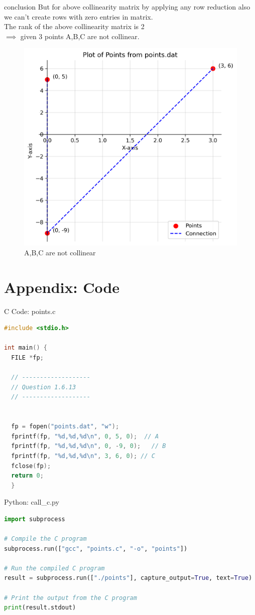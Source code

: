 \documentclass{beamer}
\numberwithin{equation}{section}
\theoremstyle{remark}
\begin{document}
\begin{frame}{conclusion}
    But  for above collinearity matrix by applying any row reduction also we can't create  rows with zero entries in matrix.\\
 The rank of the above collinearity matrix is 2\\
 $\implies$ given 3 points A,B,C are not collinear.
 \begin{figure}[h!]
   \centering
   \includegraphics[width=0.5\linewidth]{figs/01.png}
   \caption{A,B,C are not collinear}
   \label{}
\end{figure}
\end{frame}
\section*{Appendix: Code}

\begin{frame}[fragile]{C Code: points.c}
\begin{lstlisting}[language=C]
#include <stdio.h>

int main() {
  FILE *fp;

  // -------------------
  // Question 1.6.13
  // -------------------


  fp = fopen("points.dat", "w");
  fprintf(fp, "%d,%d,%d\n", 0, 5, 0);  // A
  fprintf(fp, "%d,%d,%d\n", 0, -9, 0);   // B
  fprintf(fp, "%d,%d,%d\n", 3, 6, 0); // C
  fclose(fp);
  return 0;
  }
\end{lstlisting}
\end{frame}

\begin{frame}[fragile]{Python: call\_c.py}
\begin{lstlisting}[language=Python]
import subprocess

# Compile the C program
subprocess.run(["gcc", "points.c", "-o", "points"])

# Run the compiled C program
result = subprocess.run(["./points"], capture_output=True, text=True)

# Print the output from the C program
print(result.stdout)
\end{lstlisting}
\end{frame}
\end{document}
